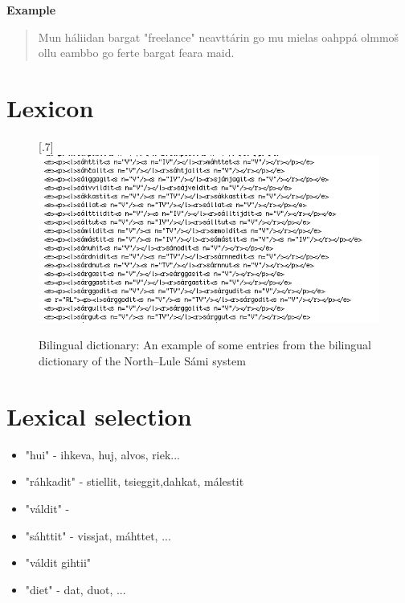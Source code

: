 \documentclass[a4paper,english,12pt]{article}
\begin{document}
\begin{spacing}{1.0}
\textbf{Example}
\begin{quote}
Mun háliidan bargat "freelance" neavttárin go mu mielas oahppá olmmoš ollu eambbo go ferte bargat feara maid.
\end{quote}



\section{Lexicon}

\begin{figure}
\centering
\scalebox{.7}[.7]{\includegraphics{bidix.png}}
  \caption{Bilingual dictionary: An example of some entries from the bilingual dictionary of the North--Lule Sámi system}
\end{figure}


\section{Lexical selection}
\begin{itemize}
\item "hui" - ihkeva, huj, alvos, riek...
\item "ráhkadit" - stiellit, tsieggit,dahkat, málestit
\item "váldit" - 
\item "sáhttit" - vissjat, máhttet, ...
\item "váldit gihtii" 
\item "diet" - dat, duot, ...
\end{itemize}



\end{spacing}
\end{document}
